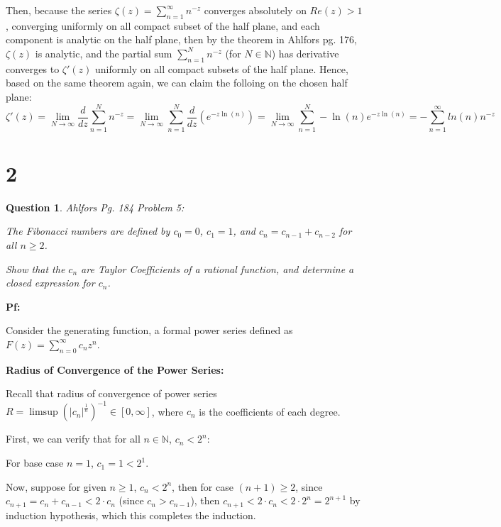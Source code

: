 \documentclass{article}
\newtheorem{question}{Question}
\begin{document}
Then, because the series $\zeta(z)=\sum_{n=1}^{\infty}n^{-z}$ converges absolutely on $Re(z)>1$, converging uniformly on all compact subset of the half plane, and each component is analytic on the half plane,
then by the theorem in Ahlfors pg. 176, $\zeta(z)$ is analytic, and the partial sum $\sum_{n=1}^{N}n^{-z}$ (for $N\in\mathbb{N}$) has derivative converges to  $\zeta'(z)$ uniformly on all compact subsets of the half plane.
Hence, based on the same theorem again, we can claim the folloing on the chosen half plane:
$$\zeta'(z)=\lim_{N\rightarrow\infty}\frac{d}{dz}\sum_{n=1}^{N}n^{-z} = \lim_{N\rightarrow\infty}\sum_{n=1}^{N}\frac{d}{dz}(e^{-z\ln(n)}) = \lim_{N\rightarrow\infty}\sum_{n=1}^{N}-\ln(n)e^{-z\ln(n)} = -\sum_{n=1}^{\infty}ln(n)n^{-z}$$


\break

\section*{2}
\begin{myBox}[]{}
    \begin{question}
        Ahlfors Pg. 184 Problem 5:

        The Fibonacci numbers are defined by $c_0=0$, $c_1=1$, and $c_n=c_{n-1}+c_{n-2}$ for all $n\geq 2$.
        
        Show that the $c_n$ are Taylor Coefficients of a rational function, and determine a closed expression for $c_n$.
    \end{question}
\end{myBox}

\textbf{Pf:}

Consider the generating function, a formal power series defined as $F(z)=\sum_{n=0}^{\infty}c_nz^n$.

\hfil

\textbf{Radius of Convergence of the Power Series:}

Recall that radius of convergence of power series $R=\limsup(|c_n|^{\frac{1}{n}})^{-1}\in [0,\infty]$, where $c_n$ is the coefficients of each degree.

First, we can verify that for all $n\in\mathbb{N}$, $c_n<2^n$:

For base case $n=1$, $c_1=1<2^1$.

Now, suppose for given $n\geq 1$, $c_n<2^n$, then for case $(n+1)\geq 2$, since $c_{n+1}=c_n+c_{n-1} < 2\cdot c_n$ (since $c_{n}>c_{n-1}$), then $c_{n+1}<2\cdot c_n<2\cdot 2^n=2^{n+1}$
by induction hypothesis, which this completes the induction.
\end{document}

